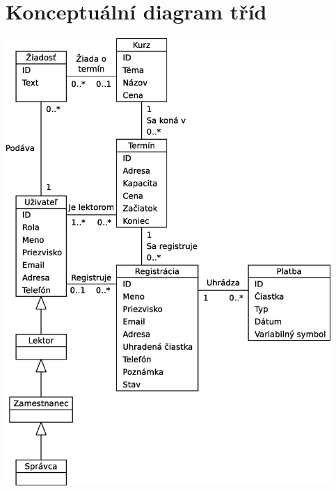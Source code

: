 \documentclass[12pt,a4paper,titlepage,final]{report}
\begin{document}
\chapter{Konceptuální diagram tříd}

		\begin{center}
			\captionsetup{type=figure}
			\includegraphics[height=17cm]{img/konceptualny_diagram_tried.eps}
		\end{center}

		
\end{document}
